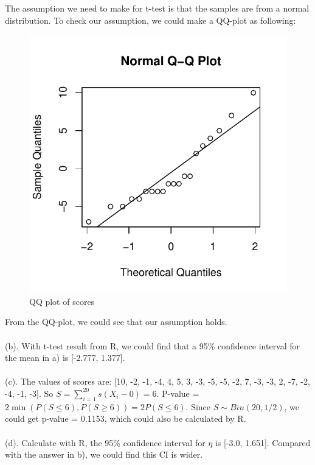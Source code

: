 \documentclass[twoside,11pt]{homework}
\begin{document}
The assumption we need to make for t-test is that the samples are from a normal distribution. 
To check our assumption, we could make a QQ-plot as following:
%
\begin{figure}[h]
\centering
\includegraphics[scale=1]{Rplot01.pdf}
\caption{QQ plot of scores}
\label{F1}
\end{figure}
%
From the QQ-plot, we could see that our assumption holds.
\\\\
(b).
With t-test result from R, we could find that a 95\% confidence interval for the mean in a) is [-2.777, 1.377].
\\\\
(c).
The values of scores are: [10, -2, -1, -4,  4,  5,  3, -3, -5, -5, -2,  7, -3, -3,  2, -7, -2, -4, -1, -3].
So $S=\sum_{i=1}^{20} s(X_i - 0) = 6$.
P-value = $2\min(P(S \le 6), P(S \ge 6)) = 2 P(S \le 6)$.
Since $S \sim Bin(20, 1/2)$, we could get p-value = 0.1153, which could also be calculated by R.
\\\\
(d).
Calculate with R, the 95\% confidence interval for $\eta$ is [-3.0, 1.651].
Compared with the answer in b), we could find this CI is wider.
\end{document}
